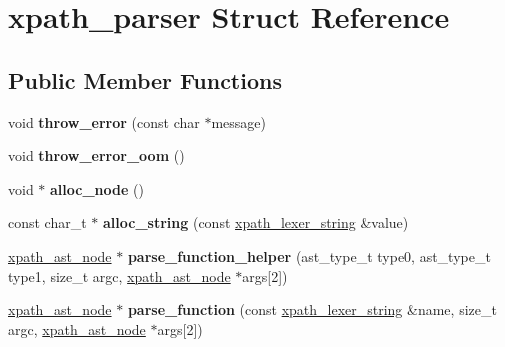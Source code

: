 \hypertarget{structxpath__parser}{\section{xpath\-\_\-parser Struct Reference}
\label{structxpath__parser}
}
\subsection*{Public Member Functions}
\begin{DoxyCompactItemize}
\item 
\hypertarget{structxpath__parser_a043353db574741cd4f460a042a0b22c6}{void {\bfseries throw\-\_\-error} (const char $\ast$message)}\label{structxpath__parser_a043353db574741cd4f460a042a0b22c6}

\item 
\hypertarget{structxpath__parser_aeb5c7d7a6f8c5705a769297f42960c3e}{void {\bfseries throw\-\_\-error\-\_\-oom} ()}\label{structxpath__parser_aeb5c7d7a6f8c5705a769297f42960c3e}

\item 
\hypertarget{structxpath__parser_ae33adcc8eb125124967d95297daff351}{void $\ast$ {\bfseries alloc\-\_\-node} ()}\label{structxpath__parser_ae33adcc8eb125124967d95297daff351}

\item 
\hypertarget{structxpath__parser_a109e4c472bb76911a2b49ee741d400af}{const char\-\_\-t $\ast$ {\bfseries alloc\-\_\-string} (const \hyperlink{structxpath__lexer__string}{xpath\-\_\-lexer\-\_\-string} \&value)}\label{structxpath__parser_a109e4c472bb76911a2b49ee741d400af}

\item 
\hypertarget{structxpath__parser_a21a1a2579c610e0ebd76247b9d325bb1}{\hyperlink{classxpath__ast__node}{xpath\-\_\-ast\-\_\-node} $\ast$ {\bfseries parse\-\_\-function\-\_\-helper} (ast\-\_\-type\-\_\-t type0, ast\-\_\-type\-\_\-t type1, size\-\_\-t argc, \hyperlink{classxpath__ast__node}{xpath\-\_\-ast\-\_\-node} $\ast$args\mbox{[}2\mbox{]})}\label{structxpath__parser_a21a1a2579c610e0ebd76247b9d325bb1}

\item 
\hypertarget{structxpath__parser_a7acb32147ef3aac058f94257b57ff14f}{\hyperlink{classxpath__ast__node}{xpath\-\_\-ast\-\_\-node} $\ast$ {\bfseries parse\-\_\-function} (const \hyperlink{structxpath__lexer__string}{xpath\-\_\-lexer\-\_\-string} \&name, size\-\_\-t argc, \hyperlink{classxpath__ast__node}{xpath\-\_\-ast\-\_\-node} $\ast$args\mbox{[}2\mbox{]})}\label{structxpath__parser_a7acb32147ef3aac058f94257b57ff14f}


\end{DoxyCompactItemize}

